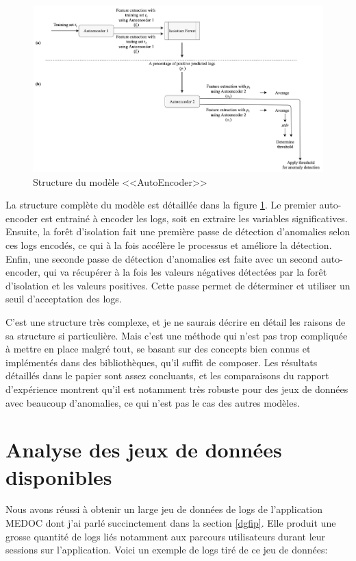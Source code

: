 \documentclass[openany, 11pt]{memoir}
\begin{document}
\begin{figure}[ht]
	\centering
	\includegraphics[width=\textwidth]{images/modeleautoencoder.png}
	\caption{Structure du modèle <<AutoEncoder>>}
	\label{modeleautoencoder}
\end{figure}

\bigskip
La structure complète du modèle est détaillée dans la figure \ref{modeleautoencoder}. Le premier auto-encoder est entrainé à encoder les \glspl{log}, soit en extraire les variables significatives. Ensuite, la forêt d'isolation fait une première passe de détection d'anomalies selon ces logs encodés, ce qui à la fois accélère le processus et améliore la détection. Enfin, une seconde passe de détection d'anomalies est faite avec un second auto-encoder, qui va récupérer à la fois les valeurs négatives détectées par la forêt d'isolation et les valeurs positives. Cette passe permet de déterminer et utiliser un seuil d'acceptation des logs.

C'est une structure très complexe, et je ne saurais décrire en détail les raisons de sa structure si particulière. Mais c'est une méthode qui n'est pas trop compliquée à mettre en place malgré tout, se basant sur des concepts bien connus et implémentés dans des bibliothèques, qu'il suffit de composer. Les résultats détaillés dans le papier sont assez concluants, et les comparaisons du rapport d'expérience \cite{experiencereport} montrent qu'il est notamment très robuste pour des jeux de données avec beaucoup d'anomalies, ce qui n'est pas le cas des autres modèles.

\newpage
\section{Analyse des jeux de données disponibles}

Nous avons réussi à obtenir un large jeu de données de \glspl{log} de l'application \gls{MEDOC} dont j'ai parlé succinctement dans la section \ref{dgfip}. Elle produit une grosse quantité de logs liés notamment aux parcours utilisateurs durant leur sessions sur l'application. Voici un exemple de logs tiré de ce jeu de données:
\end{document}
